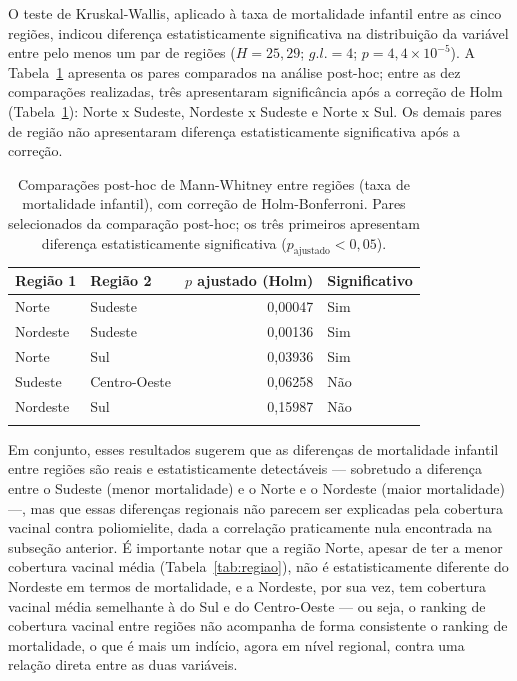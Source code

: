 \documentclass[pdflatex,sn-mathphys-num]{sn-jnl}
\begin{document}
O teste de Kruskal-Wallis, aplicado à taxa de mortalidade infantil entre as cinco regiões, indicou diferença estatisticamente significativa na distribuição da variável entre pelo menos um par de regiões ($H = 25{,}29$; $g.l. = 4$; $p = 4{,}4 \times 10^{-5}$). A Tabela~\ref{tab:posthoc} apresenta os pares comparados na análise post-hoc; entre as dez comparações realizadas, três apresentaram significância após a correção de Holm (Tabela~\ref{tab:posthoc}): Norte x Sudeste, Nordeste x Sudeste e Norte x Sul. Os demais pares de região não apresentaram diferença estatisticamente significativa após a correção.

\begin{table}[h]
\centering
\caption{Comparações post-hoc de Mann-Whitney entre regiões (taxa de mortalidade infantil), com correção de Holm-Bonferroni. Pares selecionados da comparação post-hoc; os três primeiros apresentam diferença estatisticamente significativa ($p_{\text{ajustado}} < 0{,}05$).}\label{tab:posthoc}
\begin{tabular}{@{}llrl@{}}
\toprule
Região 1 & Região 2 & $p$ ajustado (Holm) & Significativo \\
\midrule
Norte & Sudeste & 0,00047 & Sim \\
Nordeste & Sudeste & 0,00136 & Sim \\
Norte & Sul & 0,03936 & Sim \\
Sudeste & Centro-Oeste & 0,06258 & Não \\
Nordeste & Sul & 0,15987 & Não \\
\botrule
\end{tabular}
\end{table}

Em conjunto, esses resultados sugerem que as diferenças de mortalidade infantil entre regiões são reais e estatisticamente detectáveis — sobretudo a diferença entre o Sudeste (menor mortalidade) e o Norte e o Nordeste (maior mortalidade) —, mas que essas diferenças regionais não parecem ser explicadas pela cobertura vacinal contra poliomielite, dada a correlação praticamente nula encontrada na subseção anterior. É importante notar que a região Norte, apesar de ter a menor cobertura vacinal média (Tabela~\ref{tab:regiao}), não é estatisticamente diferente do Nordeste em termos de mortalidade, e a Nordeste, por sua vez, tem cobertura vacinal média semelhante à do Sul e do Centro-Oeste — ou seja, o ranking de cobertura vacinal entre regiões não acompanha de forma consistente o ranking de mortalidade, o que é mais um indício, agora em nível regional, contra uma relação direta entre as duas variáveis.
\end{document}
